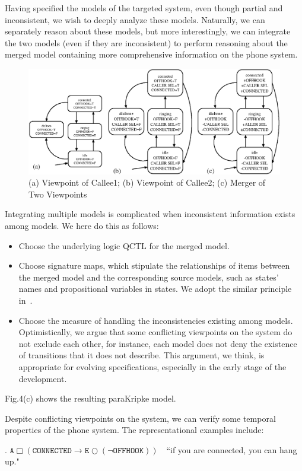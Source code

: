 \documentclass{entcs}
\begin{document}
Having specified the models of the targeted system, even though
partial and inconsistent, we wish to deeply analyze these models.
Naturally, we can separately reason about these models, but more
interestingly, we can integrate the two models (even if they are
inconsistent) to perform reasoning about the merged model
containing more comprehensive information on the phone system.
\begin{figure}
\centering
\includegraphics[scale=0.6]{merge2.eps}
\caption{(a) Viewpoint of Callee1; (b) Viewpoint of Callee2; (c)
Merger of Two Viewpoints} \label{fig:Example}
\end{figure}
Integrating multiple models is complicated when inconsistent
information exists among models. We here do this as follows:
\begin{itemize}
\item Choose the underlying logic QCTL for the merged model.
\item Choose signature maps, which stipulate the relationships of
items between the merged model and the corresponding source
models, such as states' names and propositional variables in
states. We adopt the similar principle in~\cite{Merging}.
\item
Choose the measure of handling the inconsistencies existing among
models. Optimistically, we argue that some conflicting viewpoints on
the system do not exclude each other, for instance, each model does
not deny the existence of transitions that it does not describe.
This argument, we think, is appropriate for evolving specifications,
especially in the early stage of the development.
\end{itemize}
Fig.4(c) shows the resulting paraKripke model.

Despite conflicting viewpoints on the system, we can verify some
temporal properties of the phone system. The representational
examples include:\small

. $\texttt{A}\Box
(\texttt{CONNECTED}\rightarrow\texttt{E}\bigcirc(\neg\texttt{OFFHOOK}))\
\ \ $ ``if you are connected, you can hang up."
\end{document}
